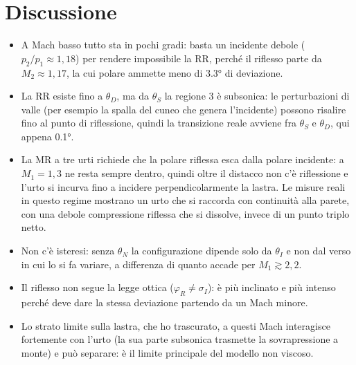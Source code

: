 \section*{Discussione}
\begin{itemize}
\item A Mach basso tutto sta in pochi gradi: basta un incidente debole ($p_2/p_1\approx1{,}18$) per rendere impossibile
  la RR, perché il riflesso parte da $M_2\approx1{,}17$, la cui polare ammette meno di \ang{3.3} di deviazione.
\item La RR esiste fino a $\theta_D$, ma da $\theta_S$ la regione 3 è subsonica: le perturbazioni di valle (per esempio
  la spalla del cuneo che genera l'incidente) possono risalire fino al punto di riflessione, quindi la transizione
  reale avviene fra $\theta_S$ e $\theta_D$, qui appena \ang{0.1}.
\item La MR a tre urti richiede che la polare riflessa esca dalla polare incidente: a $M_1=1{,}3$ ne resta sempre
  dentro, quindi oltre il distacco non c'è riflessione e l'urto si incurva fino a incidere perpendicolarmente la
  lastra. Le misure reali in questo regime mostrano un urto che si raccorda con continuità alla parete, con una
  debole compressione riflessa che si dissolve, invece di un punto triplo netto.
\item Non c'è isteresi: senza $\theta_N$ la configurazione dipende solo da $\theta_I$ e non dal verso in cui lo si
  fa variare, a differenza di quanto accade per $M_1\gtrsim2{,}2$.
\item Il riflesso non segue la legge ottica ($\varphi_R\ne\sigma_I$): è più inclinato e più intenso perché deve dare
  la stessa deviazione partendo da un Mach minore.
\item Lo strato limite sulla lastra, che ho trascurato, a questi Mach interagisce fortemente con l'urto (la sua parte
  subsonica trasmette la sovrapressione a monte) e può separare: è il limite principale del modello non viscoso.
\end{itemize}


